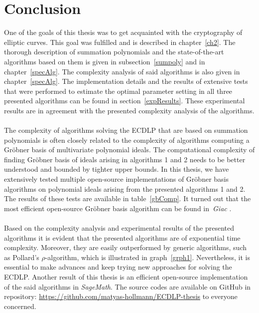 \documentclass[thesis=M,english]{FITthesis}[2012/10/20]
\theoremstyle{remark}
\theoremstyle{definition}
\begin{document}
\chapter{Conclusion}
One of the goals of this thesis was to get acquainted with the cryptography of elliptic curves. This goal was fulfilled and is described in chapter~\ref{ch2}. The thorough description of summation polynomials and the state-of-the-art algorithms based on them is given in subsection~\ref{sumpoly} and in chapter~\ref{specAlg}. The complexity analysis of said algorithms is also given in chapter~\ref{specAlg}. The implementation details and the results of extensive tests that were performed to estimate the optimal parameter setting in all three presented algorithms can be found in section~\ref{expResults}. These experimental results are in agreement with the presented complexity analysis of the algorithms. 
\\ \\
\noindent The complexity of algorithms solving the ECDLP that are based on summation polynomials is often closely related to the complexity of algorithms computing a Gröbner basis of multivariate polynomial ideals. The computational complexity of finding Gröbner basis of ideals arising in algorithms 1 and 2 needs to be better understood and bounded by tighter upper bounds. In this thesis, we have extensively tested multiple open-source implementations of Gröbner basis algorithms on polynomial ideals arising from the presented algorithms 1 and 2. The results of these tests are available in table~\ref{gbComp}. It turned out that the most efficient open-source Gröbner basis algorithm can be found in~\textit{Giac} \cite{giac}. 
\\ \\
\noindent Based on the complexity analysis and experimental results of the presented algorithms it is evident that the presented algorithms are of exponential time complexity. Moreover, they are easily outperformed by generic algorithms, such as Pollard's $\rho$-algorithm, which is illustrated in graph~\ref{grph1}. Nevertheless, it is essential to make advances and keep trying new approaches for solving the ECDLP. Another result of this thesis is an efficient  open-source implementation of the said algorithms in \textit{SageMath}. The source codes are available on GitHub in repository: \url{https://github.com/matyas-hollmann/ECDLP-thesis} to everyone concerned.

%
%

\end{document}
